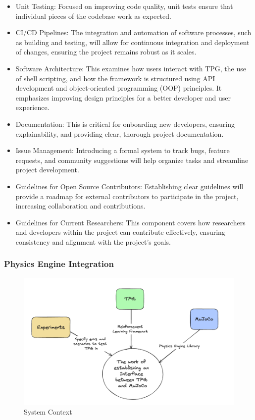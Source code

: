 \documentclass[12pt]{article}
\begin{document}
\begin{itemize}
  \item Unit Testing: Focused on improving code quality, unit tests ensure that individual pieces of the codebase work as expected.
  \item CI/CD Pipelines: The integration and automation of software processes, such as building and testing, will allow for continuous integration and deployment of changes, ensuring the project remains robust as it scales.
  \item Software Architecture: This examines how users interact with TPG, the use of shell scripting, and how the framework is structured using API development and object-oriented programming (OOP) principles. It emphasizes improving design principles for a better developer and user experience.
  \item Documentation: This is critical for onboarding new developers, ensuring explainability, and providing clear, thorough project documentation.
  \item Issue Management: Introducing a formal system to track bugs, feature requests, and community suggestions will help organize tasks and streamline project development.
  \item Guidelines for Open Source Contributors: Establishing clear guidelines will provide a roadmap for external contributors to participate in the project, increasing collaboration and contributions.
  \item Guidelines for Current Researchers: This component covers how researchers and developers within the project can contribute effectively, ensuring consistency and alignment with the project's goals.
\end{itemize}

\subsubsection{Physics Engine Integration}
\begin{figure}[hbt!]
  \begin{center}
   \includegraphics[scale=0.5]{PhysicsEngineContext.png}
  \caption{System Context}
  \label{Fig_PhysicsEngineContext} 
  \end{center}
\end{figure}
\end{document}
